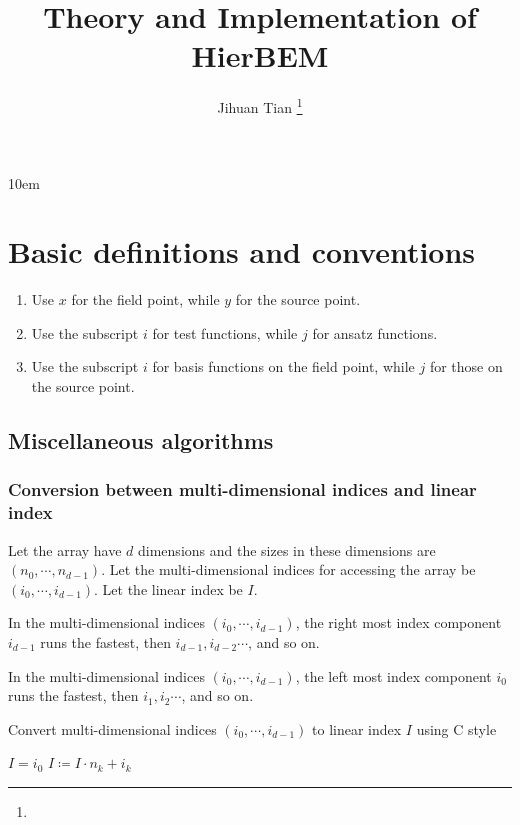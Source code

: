 \documentclass[11pt, a4paper]{book}
\begin{document}
\emergencystretch 10em
\title{Theory and Implementation of HierBEM}
\author{Jihuan Tian \footnote{\myemail}}
\maketitle
\tableofcontents

\chapter{Basic definitions and conventions}

\begin{enumerate}
\item Use $x$ for the field point, while $y$ for the source point.
\item Use the subscript $i$ for test functions, while $j$ for ansatz functions.
\item Use the subscript $i$ for basis functions on the field point, while $j$ for those on
  the source point.
\end{enumerate}

\section{Miscellaneous algorithms}

\subsection{Conversion between multi-dimensional indices and linear index}

Let the array have $d$ dimensions and the sizes in these dimensions are
$(n_0, \cdots, n_{d-1})$. Let the multi-dimensional indices for accessing the array be
$(i_0, \cdots, i_{d-1})$. Let the linear index be $I$.

\begin{Definition}  
  In the multi-dimensional indices $(i_0,\cdots,i_{d-1})$, the right most index component
  $i_{d-1}$ runs the fastest, then $i_{d-1}, i_{d-2} \cdots$, and so on.
\end{Definition}

\begin{Definition}
  In the multi-dimensional indices $(i_0,\cdots,i_{d-1})$, the left most index component
  $i_{0}$ runs the fastest, then $i_1, i_2 \cdots$, and so on.
\end{Definition}

\begin{breakablealgorithm}
  \caption{Convert multi-dimensional indices $(i_0,\cdots,i_{d-1})$ to linear index $I$ using C style}
  \begin{algorithmic}[1]
    \State $I = i_0$
      \State $I \coloneqq I \cdot n_k + i_k$
    \EndFor
  \end{algorithmic}
\end{breakablealgorithm}
\end{document}
